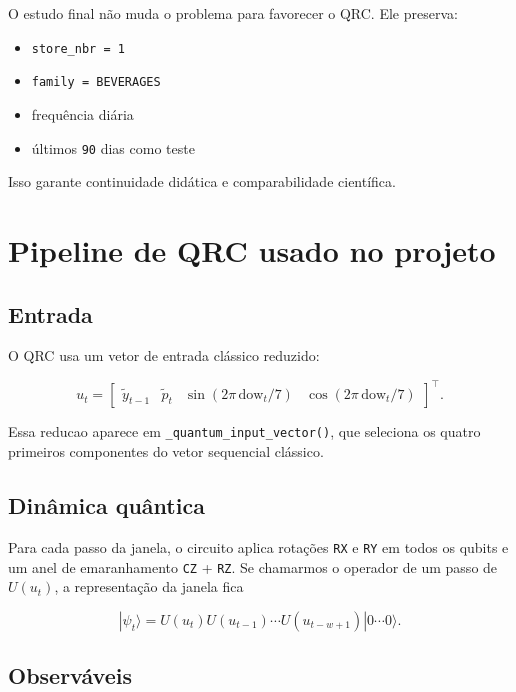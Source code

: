 \documentclass[12pt]{article}
\providecommand{\tightlist}{%
          \setlength{\itemsep}{0pt}\setlength{\parskip}{0pt}}
\begin{document}
O estudo final não muda o problema para favorecer o QRC. Ele preserva:

\begin{itemize}
\tightlist
\item
  \texttt{store\_nbr\ =\ 1}
\item
  \texttt{family\ =\ BEVERAGES}
\item
  frequência diária
\item
  últimos \texttt{90} dias como teste
\end{itemize}

Isso garante continuidade didática e comparabilidade científica.

\section{Pipeline de QRC usado no projeto}\label{3-pipeline-de-qrc-usado-no-projeto}

\subsection{Entrada}\label{31-entrada}

O QRC usa um vetor de entrada clássico reduzido:

\[
u_t =
\begin{bmatrix}
\widetilde{y}_{t-1} &
\widetilde{p}_t &
\sin(2\pi \, \mathrm{dow}_t / 7) &
\cos(2\pi \, \mathrm{dow}_t / 7)
\end{bmatrix}^\top.
\]

Essa reducao aparece em \texttt{\_quantum\_input\_vector()}, que seleciona os quatro primeiros componentes do vetor sequencial clássico.

\subsection{Dinâmica quântica}\label{32-dinuxe2mica-quuxe2ntica}

Para cada passo da janela, o circuito aplica rotações \texttt{RX} e \texttt{RY} em todos os qubits e um anel de emaranhamento \texttt{CZ} + \texttt{RZ}. Se chamarmos o operador de um passo de \(U(u_t)\), a representação da janela fica

\[
|\psi_t\rangle = U(u_t) U(u_{t-1}) \cdots U(u_{t-w+1}) |0 \cdots 0\rangle.
\]

\subsection{Observáveis}\label{33-observuxe1veis}
\end{document}
